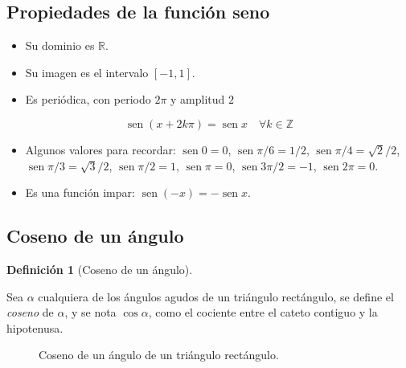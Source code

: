 \documentclass[
  a4paper,
]{scrreport}
\providecommand{\tightlist}{%
  \setlength{\itemsep}{0pt}\setlength{\parskip}{0pt}}\usepackage{longtable,booktabs,array}
\theoremstyle{plain}
\theoremstyle{plain}
\theoremstyle{definition}
\newtheorem{definition}{Definición}[chapter]
\theoremstyle{definition}
\theoremstyle{plain}
\theoremstyle{remark}
\begin{document}
\hypertarget{propiedades-de-la-funciuxf3n-seno}{%
\subsection{Propiedades de la función
seno}\label{propiedades-de-la-funciuxf3n-seno}}

\begin{itemize}
\tightlist
\item
  Su dominio es \(\mathbb{R}\).
\item
  Su imagen es el intervalo \([-1,1]\).
\item
  Es periódica, con periodo \(2\pi\) y amplitud \(2\)
\end{itemize}

\[\operatorname{sen} (x+2k\pi)= \operatorname{sen} x\quad \forall k\in \mathbb{Z}\]

\begin{itemize}
\tightlist
\item
  Algunos valores para recordar: \(\operatorname{sen} 0=0\),
  \(\operatorname{sen} \pi/6= 1/2\),
  \(\operatorname{sen} \pi/4=\sqrt{2}/2\),
  \(\operatorname{sen} \pi/3= \sqrt{3}/2\),
  \(\operatorname{sen} \pi/2 =1\), \(\operatorname{sen} \pi = 0\),
  \(\operatorname{sen} 3\pi/2=-1\), \(\operatorname{sen} 2\pi=0\).
\item
  Es una función impar:
  \(\operatorname{sen}(-x)=-\operatorname{sen} x\).
\end{itemize}

\hypertarget{coseno-de-un-uxe1ngulo}{%
\subsection{Coseno de un ángulo}\label{coseno-de-un-uxe1ngulo}}

\leavevmode{}%
\begin{definition}[Coseno de un ángulo]\label{def-coseno-angulo}

Sea \(\alpha\) cualquiera de los ángulos agudos de un triángulo
rectángulo, se define el \emph{coseno} de \(\alpha\), y se nota
\(\cos \alpha\), como el cociente entre el cateto contiguo y la
hipotenusa.

\end{definition}

\begin{figure}

{\centering 



}

\caption{Coseno de un ángulo de un triángulo rectángulo.}

\end{figure}
\end{document}
